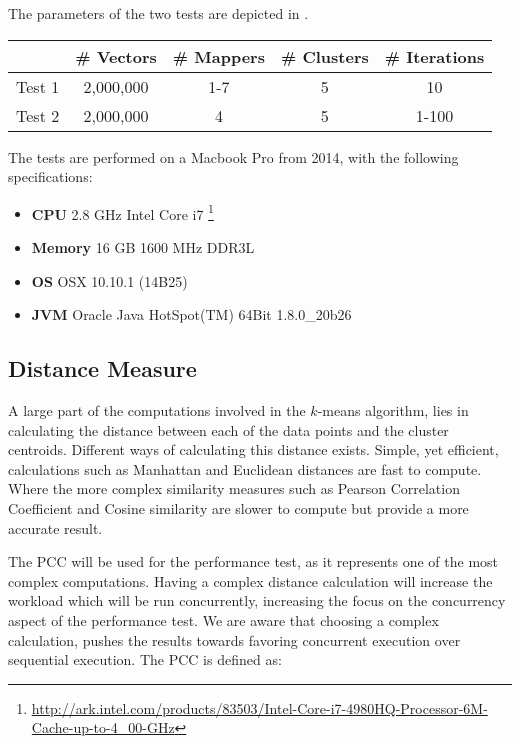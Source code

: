 The parameters of the two tests are depicted in .

\begin{center}
\begin{table}[h]
\centering
\begin{tabular}{c|cccc}
       & \# Vectors        & \# Mappers			 	& \# Clusters & \# Iterations \\ \hline
Test 1 & 2,000,000         & 1-7        			& 5           & 10            \\
Test 2 & 2,000,000		   & 4          			& 5           & 1-100           
\end{tabular}
\end{table}
 \label{tab:test_description} 
\end{center}

The tests are performed on a Macbook Pro from 2014, with the following specifications:
\begin{itemize}
	\item \textbf{CPU} 2.8 GHz Intel Core i7 \footnote{\url{http://ark.intel.com/products/83503/Intel-Core-i7-4980HQ-Processor-6M-Cache-up-to-4_00-GHz}}
	\item \textbf{Memory} 16 GB 1600 MHz DDR3L
	\item \textbf{\ac{OS}} OSX 10.10.1 (14B25)
	\item \textbf{\ac{JVM}} Oracle Java HotSpot(TM) 64\-Bit 1.8.0\_20\-b26  
\end{itemize}


\subsection{Distance Measure}
A large part of the computations involved in the $k$-means algorithm, lies in calculating the distance between each of the data points and the cluster centroids. Different ways of calculating this distance exists. Simple, yet efficient, calculations such as Manhattan and Euclidean\cite[p. 41]{amatriain2011data} distances are fast to compute. Where the more complex similarity measures such as Pearson Correlation Coefficient and Cosine similarity\cite[p. 42]{amatriain2011data}\cite{breese1998empirical} are slower to compute but provide a more accurate result.

The \ac{PCC} will be used for the performance test, as it represents one of the most complex computations. Having a complex distance calculation will increase the workload which will be run concurrently, increasing the focus on the concurrency aspect of the performance test. We are aware that choosing a complex calculation, pushes the results towards favoring concurrent execution over sequential execution. The \ac{PCC} is 
defined as:

